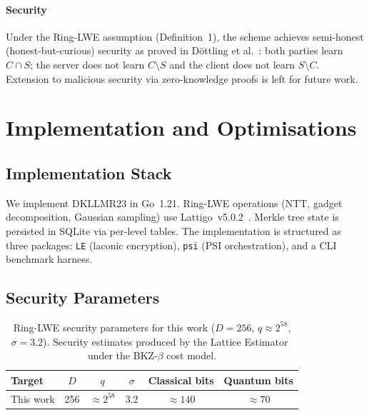 \documentclass[preprint,12pt]{elsarticle}
\begin{document}
\paragraph{Security}
Under the Ring-LWE assumption (Definition~1), the scheme achieves
semi-honest (honest-but-curious) security as proved in
D\"{o}ttling et al.~\cite{dottling2023laconic}: both parties learn
$C \cap S$; the server does not learn $C \setminus S$ and the client does
not learn $S \setminus C$. Extension to malicious security via
zero-knowledge proofs is left for future work.

\section{Implementation and Optimisations}
\label{sec:impl}

\subsection{Implementation Stack}

We implement DKLLMR23 in Go~1.21. Ring-LWE operations (NTT, gadget
decomposition, Gaussian sampling) use Lattigo~v5.0.2~\cite{lattigo2024}.
Merkle tree state is persisted in SQLite via per-level tables. The
implementation is structured as three packages: \texttt{LE} (laconic
encryption), \texttt{psi} (PSI orchestration), and a CLI benchmark harness.

\subsection{Security Parameters}
\label{subsec:params}

\begin{table}[t]
\centering
\caption{Ring-LWE security parameters for this work ($D=256$, $q\approx 2^{58}$,
$\sigma=3.2$). Security estimates produced by the Lattice Estimator~\cite{albrecht2015concrete,albrecht2021lattice}
under the BKZ-$\beta$ cost model.}
\label{tab:params}
\begin{tabular}{@{}lccccc@{}}
\toprule
\textbf{Target} & $D$ & $q$ & $\sigma$ & \textbf{Classical bits} & \textbf{Quantum bits} \\
\midrule
This work & 256  & $\approx 2^{58}$ & 3.2 & $\approx 140$ & $\approx 70$ \\
\bottomrule
\end{tabular}
\end{table}
\end{document}
